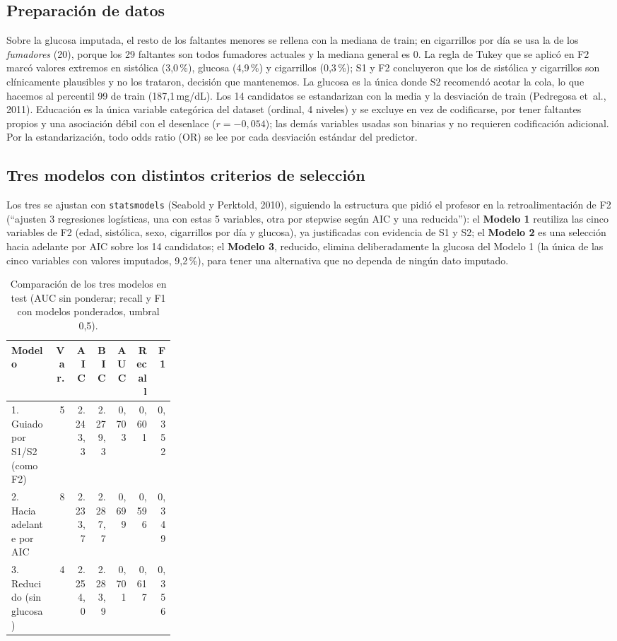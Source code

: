 \documentclass[11pt,a4paper]{article}
\begin{document}
\subsection{Preparación de datos}
Sobre la glucosa imputada, el resto de los faltantes menores se rellena con la mediana de train; en cigarrillos por día se usa la de los \emph{fumadores} (20), porque los 29 faltantes son todos fumadores actuales y la mediana general es 0. La regla de Tukey que se aplicó en F2 marcó valores extremos en sistólica (3,0\,\%), glucosa (4,9\,\%) y cigarrillos (0,3\,\%); S1 y F2 concluyeron que los de sistólica y cigarrillos son clínicamente plausibles y no los trataron, decisión que mantenemos. La glucosa es la única donde S2 recomendó acotar la cola, lo que hacemos al percentil 99 de train (187,1\,mg/dL). Los 14 candidatos se estandarizan con la media y la desviación de train (Pedregosa et~al., 2011). Educación es la única variable categórica del dataset (ordinal, 4 niveles) y se excluye en vez de codificarse, por tener faltantes propios y una asociación débil con el desenlace ($r=-0,054$); las demás variables usadas son binarias y no requieren codificación adicional. Por la estandarización, todo odds ratio (OR) se lee por cada desviación estándar del predictor.

\subsection{Tres modelos con distintos criterios de selección}
Los tres se ajustan con \texttt{statsmodels} (Seabold y Perktold, 2010), siguiendo la estructura que pidió el profesor en la retroalimentación de F2 (``ajusten 3 regresiones logísticas, una con estas 5 variables, otra por stepwise según AIC y una reducida''): el \textbf{Modelo 1} reutiliza las cinco variables de F2 (edad, sistólica, sexo, cigarrillos por día y glucosa), ya justificadas con evidencia de S1 y S2; el \textbf{Modelo 2} es una selección hacia adelante por AIC sobre los 14 candidatos; el \textbf{Modelo 3}, reducido, elimina deliberadamente la glucosa del Modelo 1 (la única de las cinco variables con valores imputados, 9,2\,\%), para tener una alternativa que no dependa de ningún dato imputado.

\begin{table}[H]
\centering\small
\caption{Comparación de los tres modelos en test (AUC sin ponderar; recall y F1 con modelos ponderados, umbral 0,5).}\label{tab:mod}
\begin{tabular}{@{}p{0.27\linewidth}rrrrrr@{}}
\toprule
\textbf{Modelo} & \textbf{Var.} & \textbf{AIC} & \textbf{BIC} & \textbf{AUC} & \textbf{Recall} & \textbf{F1} \\
\midrule
1. Guiado por S1/S2 (como F2)          & 5 & 2.243,3 & 2.279,3 & 0,703 & 0,601 & 0,352 \\
2. Hacia adelante por AIC              & 8 & 2.233,7 & 2.287,7 & 0,699 & 0,596 & 0,349 \\
3. Reducido (sin glucosa)              & 4 & 2.254,0 & 2.283,9 & 0,701 & 0,617 & 0,356 \\
\bottomrule
\end{tabular}
\end{table}
\end{document}
